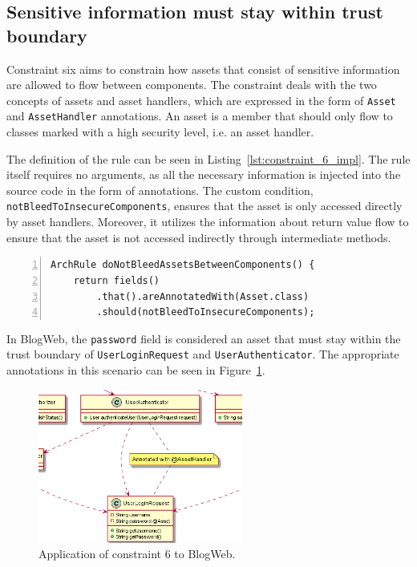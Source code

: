 \subsection{Sensitive information must stay within trust boundary}
Constraint six aims to constrain how assets that consist of sensitive information are allowed to flow between components. The constraint deals with the two concepts of assets and asset handlers, which are expressed in the form of \texttt{Asset} and \texttt{AssetHandler} annotations. An asset is a member that should only flow to classes marked with a high security level, i.e. an asset handler.

The definition of the rule can be seen in Listing~\ref{lst:constraint_6_impl}. The rule itself requires no arguments, as all the necessary information is injected into the source code in the form of annotations. The custom condition, \texttt{notBleedToInsecureComponents}, ensures that the asset is only accessed directly by asset handlers. Moreover, it utilizes the information about return value flow to ensure that the asset is not accessed indirectly through intermediate methods.

\begin{minipage}{\linewidth}
\begin{lstlisting}[caption={Rule definition for constraint 6.}, captionpos=b, label=lst:constraint_6_impl, numbers=left]
ArchRule doNotBleedAssetsBetweenComponents() {
    return fields()
        .that().areAnnotatedWith(Asset.class)
        .should(notBleedToInsecureComponents);
\end{lstlisting}
\end{minipage}

In BlogWeb, the \texttt{password} field is considered an asset that must stay within the trust boundary of \texttt{UserLoginRequest} and \texttt{UserAuthenticator}. The appropriate annotations in this scenario can be seen in Figure~\ref{fig:assets_toy_system}.

\begin{figure}[ht]
    \centering
    \includegraphics[width=0.6\textwidth]{figure/toyexamples/Assets.png}
    \caption{Application of constraint 6 to BlogWeb.}
    \label{fig:assets_toy_system}
\end{figure}

